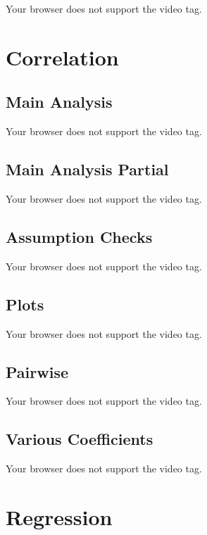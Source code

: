 \documentclass[
  letterpaper,
  DIV=11,
  numbers=noendperiod]{scrreprt}
\begin{document}
Your browser does not support the video tag.

\hypertarget{correlation}{%
\section{Correlation}\label{correlation}}

\hypertarget{main-analysis-11}{%
\subsection{Main Analysis}\label{main-analysis-11}}

Your browser does not support the video tag.

\hypertarget{main-analysis-partial}{%
\subsection{Main Analysis Partial}\label{main-analysis-partial}}

Your browser does not support the video tag.

\hypertarget{assumption-checks-2}{%
\subsection{Assumption Checks}\label{assumption-checks-2}}

Your browser does not support the video tag.

\hypertarget{plots-3}{%
\subsection{Plots}\label{plots-3}}

Your browser does not support the video tag.

\hypertarget{pairwise}{%
\subsection{Pairwise}\label{pairwise}}

Your browser does not support the video tag.

\hypertarget{various-coefficients}{%
\subsection{Various Coefficients}\label{various-coefficients}}

Your browser does not support the video tag.

\hypertarget{regression}{%
\section{Regression}\label{regression}}
\end{document}

